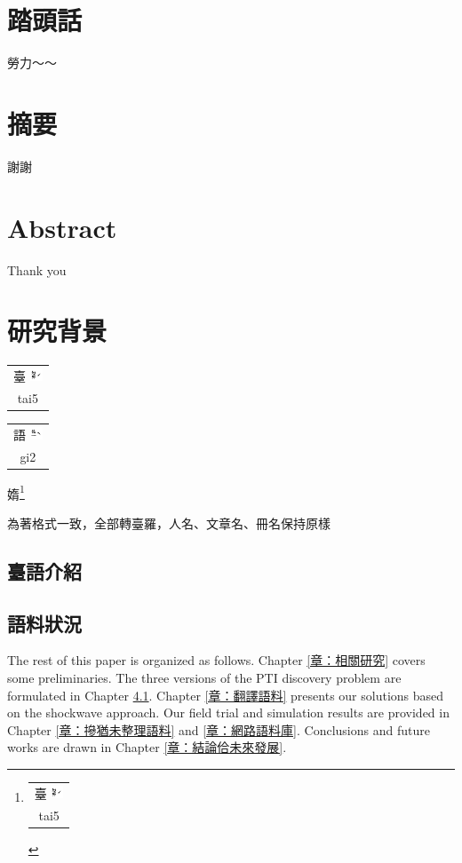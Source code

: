 \documentclass[final,oneside,onecolumn,12pt,a4paper]{book}%
\makeatletter
\newcommand{\rubybot}[2]{
  \@tempdimc \f@size\p@
  \begin{tabular}[t]{@{}c@{}}
    #1\\[-3em]
    \fontsize{.8\@tempdimc}{.8\@tempdimc}\selectfont%
    \setlength{\normalbaselineskip}{0pt}#2 
  \end{tabular}%
}
\makeatother
\begin{document}
\frontmatter
\chapter{踏頭話}
勞力～～
\newpage

\chapter{摘要}
謝謝

\newpage

\chapter{Abstract}

Thank you

\newpage

\tableofcontents
\listoffigures
\listoftables



\mainmatter


\chapter{研究背景}
\label{章：研究背景}

\rubybot{臺 \includegraphics[height=1em]{圖/⿳⿳ㄉㄞˊ}}{tai5}
\rubybot{語 \includegraphics[height=1em]{圖/⿳⿳ㆣㄧˋ}}{gi2}
媠\footnote{\rubybot{臺 \includegraphics[height=1em]{圖/⿳⿳ㄉㄞˊ}}{tai5}}

為著格式一致，全部轉臺羅，人名、文章名、冊名保持原樣

\section{臺語介紹}
\label{章：臺語介紹}

\section{語料狀況}
\label{節：語料狀況}

The rest of this paper is organized as follows. Chapter
\ref{章：相關研究} covers some preliminaries.
The three versions of the PTI discovery problem are formulated in Chapter
\ref{章：臺語介紹}. Chapter \ref{章：翻譯語料} presents our
solutions based on the shockwave approach. Our field trial and simulation
results are provided in Chapter \ref{章：摻猶未整理語料} and
\ref{章：網路語料庫}. Conclusions and future works are drawn in Chapter
\ref{章：結論佮未來發展}.
\end{document}
